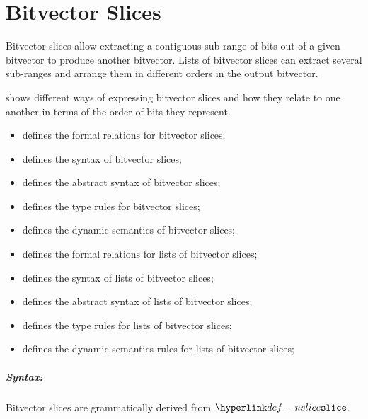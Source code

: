 \chapter{Bitvector Slices\label{chap:BitvectorSlicing}}
\hypertarget{bitsliceterm}{}
Bitvector slices allow extracting a contiguous sub-range of bits out of a given bitvector to produce
another bitvector.
Lists of bitvector slices can extract several sub-ranges and arrange them in different orders in the
output bitvector.

 shows different ways of expressing bitvector slices
and how they relate to one another in terms of the order of bits they represent.

\ChapterOutline
\begin{itemize}
  \item {} defines the formal relations for bitvector slices;
  \item {} defines the syntax of bitvector slices;
  \item {} defines the abstract syntax of bitvector slices;
  \item {} defines the type rules for bitvector slices;
  \item {} defines the dynamic semantics of bitvector slices;
  \item {} defines the formal relations for lists of bitvector slices;
  \item {} defines the syntax of lists of bitvector slices;
  \item {} defines the abstract syntax of lists of bitvector slices;
  \item {} defines the type rules for lists of bitvector slices;
  \item {} defines the dynamic semantics rules for lists of bitvector slices;
\end{itemize}

\paragraph{Syntax:} Bitvector slices are grammatically derived from $\Nslice$.

